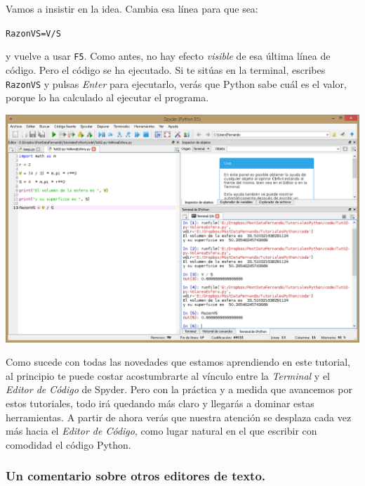 \documentclass[10pt,a4paper]{article}\usepackage[]{graphicx}\usepackage[]{color}
\makeatletter
\newcommand{\hlopt}[1]{\textcolor[rgb]{0,0,0}{#1}}%
\newcommand{\hlstd}[1]{\textcolor[rgb]{0.345,0.345,0.345}{#1}}%
\newcommand{\hlkwb}[1]{\textcolor[rgb]{0.69,0.353,0.396}{#1}}%
\newenvironment{kframe}{%
 \def\at@end@of@kframe{}%
 \ifinner\ifhmode%
  \def\at@end@of@kframe{\end{minipage}}%
  \begin{minipage}{\columnwidth}%
 \fi\fi%
 \def\FrameCommand##1{\hskip\@totalleftmargin \hskip-\fboxsep
 \colorbox{shadecolor}{##1}\hskip-\fboxsep
     \hskip-\linewidth \hskip-\@totalleftmargin \hskip\columnwidth}%
 \MakeFramed {\advance\hsize-\width
   \@totalleftmargin\z@ \linewidth\hsize
   \@setminipage}}%
 {\par\unskip\endMakeFramed%
 \at@end@of@kframe}
\newenvironment{knitrout}{}{} %
\makeatother
\begin{document}
Vamos a insistir en la idea. Cambia esa línea para que sea:
\begin{knitrout}
\color{fgcolor}\begin{kframe}
\begin{alltt}
\hlstd{RazonVS} \hlkwb{=} \hlstd{V} \hlopt{/} \hlstd{S}
\end{alltt}
\end{kframe}
\end{knitrout}
y vuelve a usar {\tt F5}. Como antes, no hay efecto {\em visible} de esa última línea de código. Pero el código se ha ejecutado. Si te sitúas en la terminal, escribes {\tt RazonVS} y pulsas {\em Enter} para ejecutarlo, verás que Python sabe cuál es el valor, porque lo ha calculado al ejecutar el programa.
\begin{center}
\includegraphics[width=15cm]{../fig/Tut-02-py-30-EditorVsTerminal}
\end{center}
Como sucede con todas las novedades que estamos aprendiendo en este tutorial, al principio te puede costar acostumbrarte al vínculo entre la {\em Terminal} y el {\em Editor de Código} de Spyder. Pero con la práctica y a medida que avancemos por estos tutoriales, todo irá quedando más claro y llegarás a dominar estas herramientas. A partir de ahora verás que nuestra atención se desplaza cada vez más hacia el {\em Editor de Código}, como lugar natural en el que escribir con comodidad el código Python. 

\subsubsection*{Un comentario sobre otros editores de texto.}
\end{document}
